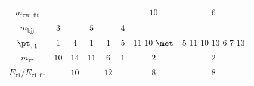 \documentclass[PAPER, coverpage, atlasdraft=true, texlive=2016, UKenglish]{\ATLASLATEXPATH atlasdoc}
\providecommand{\DIFadd}[1]{{\protect\color{blue}\uwave{#1}}} %
\providecommand{\DIFdel}[1]{{\protect\color{red}\sout{#1}}}                      %
\providecommand{\DIFaddFL}[1]{\DIFadd{#1}} %
\providecommand{\DIFdelFL}[1]{\DIFdel{#1}} %
\providecommand{\DIFaddbeginFL}{} %
\providecommand{\DIFaddendFL}{} %
\providecommand{\DIFdelbeginFL}{} %
\providecommand{\DIFdelendFL}{} %
\begin{document}
\begin{table}[t!]
\begin{tabular}{cccccccc}
   \DIFdelbeginFL \DIFdelFL{$m_{\tau\tau\text{q},\text{fit}}$                          }\DIFdelendFL \DIFaddbeginFL \DIFaddFL{$m_{\tau\tau,\text{fit}}$                                     }\DIFaddendFL &   &  \DIFaddbeginFL \DIFaddFL{$2$                }\DIFaddendFL &           & \DIFaddbeginFL \DIFaddFL{$3$      }\DIFaddendFL &       & \DIFdelbeginFL \DIFdelFL{$10$     }\DIFdelendFL \DIFaddbeginFL \DIFaddFL{$1$      }\DIFaddendFL & \DIFdelbeginFL \DIFdelFL{$6$}\DIFdelendFL \DIFaddbeginFL \DIFaddFL{$1$          }\DIFaddendFL \\  
   \DIFdelbeginFL \DIFdelFL{$m_{\text{bjj}}$                 }\DIFdelendFL \DIFaddbeginFL \DIFaddFL{$m_{\text{jj}}$                                      }\DIFaddendFL &   \DIFdelbeginFL \DIFdelFL{$3$       }\DIFdelendFL &             &           \DIFdelbeginFL \DIFdelFL{$5$              }\DIFdelendFL & \DIFaddbeginFL \DIFaddFL{$9$      }\DIFaddendFL &       \DIFdelbeginFL \DIFdelFL{$4$           }\DIFdelendFL & \DIFaddbeginFL \DIFaddFL{$6$      }\DIFaddendFL & \DIFaddbeginFL \DIFaddFL{$7$}\DIFaddendFL \\
   \DIFdelbeginFL \DIFdelFL{${\pt}_{\tau1}$                                 }\DIFdelendFL \DIFaddbeginFL \DIFaddFL{$m_{\tau\tau\text{q},\text{fit}}$                          }\DIFaddendFL &   \DIFdelbeginFL \DIFdelFL{$1$       }\DIFdelendFL &             \DIFdelbeginFL \DIFdelFL{$4$                }\DIFdelendFL &           \DIFdelbeginFL \DIFdelFL{$1$              }\DIFdelendFL &  \DIFdelbeginFL \DIFdelFL{$1$      }\DIFdelendFL &       \DIFdelbeginFL \DIFdelFL{$5$           }\DIFdelendFL & \DIFdelbeginFL \DIFdelFL{$11$   }%
\DIFdelendFL $10$\DIFdelbeginFL %
\DIFdelFL{$\met$                                              }\DIFdelendFL \DIFaddbeginFL \DIFaddFL{~~     }\DIFaddendFL & \DIFdelbeginFL \DIFdelFL{$5$       }%
\DIFdelFL{$11$               }%
\DIFdelFL{$10$             }%
\DIFdelFL{$13$     }%
\DIFdelendFL $6$\DIFdelbeginFL %
\DIFdelFL{$7$    }%
\DIFdelFL{$13$          }\DIFdelendFL \\
   $m_{\tau\tau}$                           & $10$\DIFaddbeginFL \DIFaddFL{~~      }\DIFaddendFL &  $14$\DIFaddbeginFL \DIFaddFL{~~               }\DIFaddendFL &  $11$\DIFaddbeginFL \DIFaddFL{~~             }\DIFaddendFL & $6$      & $1$           & $2$    & $2$          \\
   \DIFdelbeginFL \DIFdelFL{$E_{\tau1}/E_{\tau1,\text{fit}}$                  }\DIFdelendFL \DIFaddbeginFL \DIFaddFL{${\pt}_{\tautau} $                          }\DIFaddendFL &   &             \DIFdelbeginFL \DIFdelFL{$10$               }\DIFdelendFL &           &  \DIFdelbeginFL \DIFdelFL{$12$     }\DIFdelendFL & \DIFaddbeginFL \DIFaddFL{$9$           }\DIFaddendFL &  \DIFdelbeginFL \DIFdelFL{$8$    }\DIFdelendFL &         \DIFdelbeginFL \DIFdelFL{$8$          }\DIFdelendFL \\

\end{tabular}
\end{table}
\end{document}
